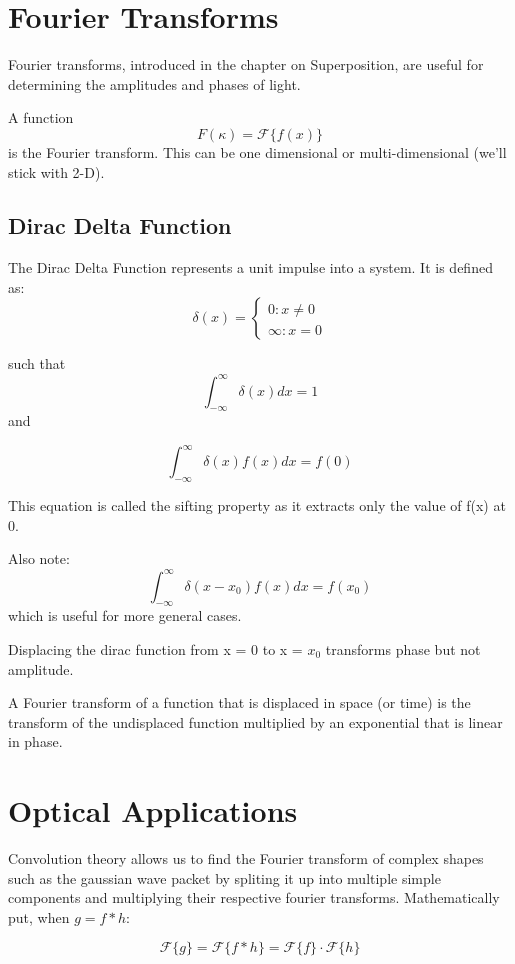 \documentclass[12pt]{report}
\begin{document}
\section{Fourier Transforms}
Fourier transforms, introduced in the chapter on Superposition, are useful for determining the amplitudes and phases of light. 

A function \[F(\kappa) = \mathcal{F} \{ f(x)\}  \] is the Fourier transform. This can be one dimensional or multi-dimensional (we'll stick with 2-D). 

\subsection{Dirac Delta Function}
The Dirac Delta Function represents a unit impulse into a system. It is defined as: \[\delta(x) = \left\{  \begin{array}{lr}
       0 : x\neq 0\\
       \infty : x = 0
     \end{array}
   \right.\]
   
such that
\[ \int_{-\infty}^\infty \delta (x) dx = 1 \] and

\begin{equation}
\int_{-\infty}^\infty \delta (x)f(x) dx = f(0)
\end{equation}

This equation is called the sifting property as it extracts only the value of f(x) at 0. 

Also note: 
\[\int_{-\infty}^\infty \delta (x-x_0)f(x) dx = f(x_0)\] which is useful for more general cases. 

Displacing the dirac function from x = 0 to x = $x_0$ transforms phase but not amplitude. 

A Fourier transform of a function that is displaced in space (or time) is the transform of the undisplaced function multiplied by an exponential that is linear in phase. 

\section{Optical Applications}
Convolution theory allows us to find the Fourier transform of complex shapes such as the gaussian wave packet by spliting it up into multiple simple components and multiplying their respective fourier transforms. Mathematically put, when $g = f * h$: 

\begin{equation}
\mathcal{F}\{g\} = \mathcal{F}\{f*h\} = \mathcal{F} \{f\} \cdot \mathcal{F}\{h\} 
\end{equation}
\end{document}

